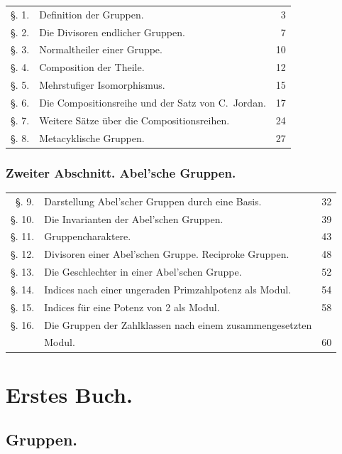 \documentclass[12pt,a4paper]{article}
\theoremstyle{plain}
\theoremstyle{definition}
\theoremstyle{remark}
\begin{document}
\begin{tabular}{rlr}
\S. 1. & Definition der Gruppen.\dotfill & 3\\
\S. 2. & Die Divisoren endlicher Gruppen.\dotfill & 7\\
\S. 3. & Normaltheiler einer Gruppe.\dotfill & 10\\
\S. 4. & Composition der Theile.\dotfill & 12\\
\S. 5. & Mehrstufiger Isomorphismus.\dotfill & 15\\
\S. 6. & Die Compositionsreihe und der Satz von C.~Jordan.\dotfill & 17\\
\S. 7. & Weitere Sätze über die Compositionsreihen.\dotfill & 24\\
\S. 8. & Metacyklische Gruppen.\dotfill & 27\\
\end{tabular}

\subsubsection*{Zweiter Abschnitt. Abel'sche Gruppen.}

\begin{tabular}{rlr}
\S. 9. & Darstellung Abel'scher Gruppen durch eine Basis.\dotfill & 32\\
\S. 10. & Die Invarianten der Abel'schen Gruppen.\dotfill & 39\\
\S. 11. & Gruppencharaktere.\dotfill & 43\\
\S. 12. & Divisoren einer Abel'schen Gruppe. Reciproke Gruppen.\dotfill & 48\\
\S. 13. & Die Geschlechter in einer Abel'schen Gruppe.\dotfill & 52\\
\S. 14. & Indices nach einer ungeraden Primzahlpotenz als Modul.\dotfill & 54\\
\S. 15. & Indices für eine Potenz von 2 als Modul.\dotfill & 58\\
\S. 16. & Die Gruppen der Zahlklassen nach einem zusammengesetzten\\
        & Modul.\dotfill & 60\\
\end{tabular}

\newpage

\section*{Erstes Buch.}
\subsection*{Gruppen.}
\end{document}
